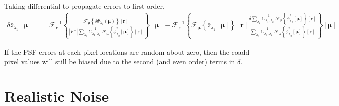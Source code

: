 \documentclass[DM,authoryear,toc]{lsstdoc}
\begin{document}
Taking differential to propagate errors to first order,
\begin{align}
    \delta\bar{z}_{\lambda_1}[\bm{\mu}]
    =&\;
    \mathcal{F}^{-1}_{\bm{r}}\!\left\{
        \frac{
            \mathcal{F}_{\bm{\mu}}\!\left\{
                \delta\Psi_{\lambda_1}(\bm{\mu})
            \right\}\!\left[
                \bm{r}
            \right]
        }{
            |F^+|
            \sum\limits_{\lambda_2}
            \bar{C}_{\lambda_1,\lambda_2}^{-1}
            \;
            \mathcal{F}_{\bm{\mu}}\!\left\{
                \bar{\phi}^*_{\lambda_2}[\bm{\mu}]
            \right\}\!\left[
                \bm{r}
            \right]
        }
        \right\}\!\left[
        \bm{\mu}
    \right] -
    \mathcal{F}^{-1}_{\bm{r}}\!\left\{
        \mathcal{F}_{\bm{\mu}}\left\{\bar{z}_{\lambda_1}[\bm{\mu}]\right\}\left[
            \bm{r}
        \right]
        \frac{
            \delta\sum\limits_{\lambda_2}
            \bar{C}_{\lambda_1,\lambda_2}^{-1}
            \;
            \mathcal{F}_{\bm{\mu}}\!\left\{
                \bar{\phi}^*_{\lambda_2}[\bm{\mu}]
            \right\}\!\left[
                \bm{r}
            \right]
        }
        {
            \sum\limits_{\lambda_2}
            \bar{C}_{\lambda_1,\lambda_2}^{-1}
            \;
            \mathcal{F}_{\bm{\mu}}\!\left\{
                \bar{\phi}^*_{\lambda_2}[\bm{\mu}]
            \right\}\!\left[
                \bm{r}
            \right]
        }
        \right\}\!\left[
        \bm{\mu}
    \right]
    \label{eqn:solution-image-differential}
\end{align}

If the PSF errors at each pixel locations are random about zero, then the coadd pixel values will still be biased due to the second (and even order) terms in $\delta$.

\section{Realistic Noise}
\end{document}
